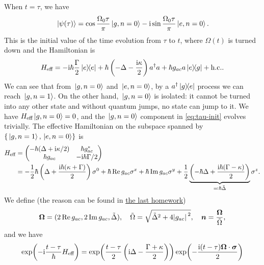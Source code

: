 \documentclass[hyperref, a4paper]{article}
\newcommand*{\ii}{\mathrm{i}}
\begin{document}
\begin{itemize}
When $t = \tau$, we have 
\begin{equation}
    \ket*{\psi(\tau)} = \cos \frac{\Omega_0 \tau}{\pi} \ket*{g, n=0} - \ii \sin \frac{\Omega_0 \tau}{\pi} \ket*{e, n=0}.
    \label{eq:tau-init}
\end{equation}
This is the initial value of the time evolution from $\tau$ to $t$, where $\Omega(t)$ is turned down and the 
Hamiltonian is 
\begin{equation}
    H_\text{eff} = - \ii \hbar \frac{\Gamma}{2} \dyad{e} + \hbar \left(- \Delta - \frac{\ii \kappa}{2}\right) a^\dagger a + \hbar g_{ac} a \dyad{e}{g} + \text{h.c.}.
\end{equation}
We can see that from $\ket*{g, n=0}$ and $\ket*{e, n=0}$, by a $a^\dagger \dyad*{g}{e}$ process we can reach 
$\ket*{g, n=1}$. On the other hand, $\ket*{g, n=0}$ is isolated: it cannot be turned into any other state and
without quantum jumps, no state can jump to it. We have $H_\text{eff} \ket*{g, n=0} = 0$, and the $\ket*{g, n=0}$
component in \eqref{eq:tau-init} evolves trivially. The effective Hamiltonian on the subspace spanned by 
$\{\ket*{g, n=1}, \ket*{e, n=0}\}$ is 
\begin{equation}
    \begin{aligned}
        H_\text{eff} &= \pmqty{ - \hbar (\Delta + \ii \kappa / 2) & \hbar g_{ac}^* \\ \hbar g_{ac} & - \ii \hbar \Gamma / 2 } \\
        &= - \frac{1}{2} \hbar \left( \Delta + \frac{\ii \hbar (\kappa + \Gamma)}{2} \right) \sigma^0 + 
        \hbar \Re g_{ac} \sigma^x + \hbar \Im g_{ac} \sigma^y + \frac{1}{2} \underbrace{\left( - \hbar \Delta + \frac{\ii \hbar (\Gamma - \kappa)}{2} \right)}_{\eqqcolon \hbar \tilde{\Delta}} \sigma^z.
    \end{aligned}
\end{equation}
We define (the reason can be found in \href{../4/4.pdf}{the last homework})
\begin{equation}
    \vb*{\Omega} = (2 \Re g_{ac}, 2 \Im g_{ac}, \tilde{\Delta}), \quad \tilde{\Omega} = \sqrt{\tilde{\Delta}^2 + 4 \abs*{g_{ac}}^2} , \quad \vb*{n} = \frac{\vb*{\Omega}}{\tilde{\Omega}},
\end{equation}
and we have 
\[
    \begin{aligned}
        \exp(- \ii \frac{t - \tau}{\hbar} H_\text{eff}) &= \exp(\frac{t - \tau}{2} \left( \ii \Delta - \frac{\Gamma + \kappa}{2} \right)) \exp(- \frac{\ii (t - \tau) \vb*{\Omega} \cdot \vb*{\sigma}}{2}) \\

\end{aligned}\]
\end{itemize}
\end{document}
